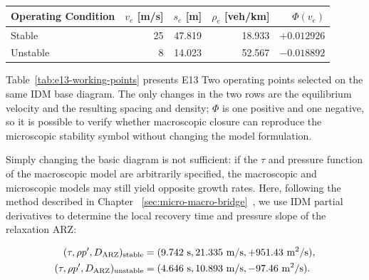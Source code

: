\documentclass[11pt,a4paper,openany]{book}
\numberwithin{equation}{chapter}
\numberwithin{figure}{chapter}
\numberwithin{table}{chapter}
\newcommand{\tabletext}[2]{%
  \par\smallskip\noindent
  Table~\ref{#1} presents #2
\par\smallskip
}
\begin{document}
\begin{center}
\small
{}
\label{tab:e13-working-points}
\begin{tabular}{lrrrr}
\toprule







Operating Condition




& $v_e$ [m/s] & $s_e$ [m] & $\rho_e$ [veh/km] & $\Phi(v_e)$ \\
\midrule







Stable




& 25 & 47.819 & 18.933 & $+0.012926$ \\







Unstable& 8 & 14.023 & 52.567 & $-0.018892$ \\
\bottomrule
\end{tabular}
\end{center}
\tabletext{tab:e13-working-points}{E13 Two operating points selected on the same IDM base diagram. The only changes in the two rows are the equilibrium velocity and the resulting spacing and density; $\Phi$ is one positive and one negative, so it is possible to verify whether macroscopic closure can reproduce the microscopic stability symbol without changing the model formulation.
}










Simply changing the basic diagram is not sufficient: if the $\tau$ and pressure function of the macroscopic model are arbitrarily specified, the macroscopic and microscopic models may still yield opposite growth rates. Here, following the method described in Chapter ~\ref{sec:micro-macro-bridge}~, we use IDM partial derivatives to determine the local recovery time and pressure slope of the relaxation ARZ:

\[
\begin{aligned}
(\tau,\rho p',D_{\rm ARZ})_{\rm stable}
  &=(9.742\ {\rm s},21.335\ {\rm m/s},+951.43\ {\rm m^2/s}),\\
(\tau,\rho p',D_{\rm ARZ})_{\rm unstable}
  &=(4.646\ {\rm s},10.893\ {\rm m/s},-97.46\ {\rm m^2/s}).
\end{aligned}
\]
\end{document}
